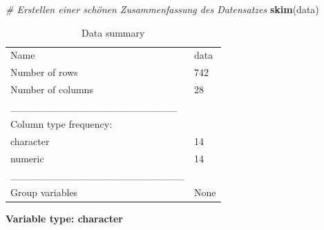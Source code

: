 \documentclass[
]{article}
\newenvironment{Shaded}{\begin{snugshade}}{\end{snugshade}}
\newcommand{\CommentTok}[1]{\textcolor[rgb]{0.56,0.35,0.01}{\textit{#1}}}
\newcommand{\FunctionTok}[1]{\textcolor[rgb]{0.13,0.29,0.53}{\textbf{#1}}}
\newcommand{\NormalTok}[1]{#1}
\begin{document}
\begin{Shaded}
\begin{Highlighting}[]
\CommentTok{\# Erstellen einer schönen Zusammenfassung des Datensatzes}
\FunctionTok{skim}\NormalTok{(data)}
\end{Highlighting}
\end{Shaded}

\begin{longtable}[]{@{}ll@{}}
\caption{Data summary}\tabularnewline
\toprule\noalign{}
\endfirsthead
\endhead
\bottomrule\noalign{}
\endlastfoot
Name & data \\
Number of rows & 742 \\
Number of columns & 28 \\
\_\_\_\_\_\_\_\_\_\_\_\_\_\_\_\_\_\_\_\_\_\_\_ & \\
Column type frequency: & \\
character & 14 \\
numeric & 14 \\
\_\_\_\_\_\_\_\_\_\_\_\_\_\_\_\_\_\_\_\_\_\_\_\_ & \\
Group variables & None \\
\end{longtable}

\textbf{Variable type: character}
\end{document}
